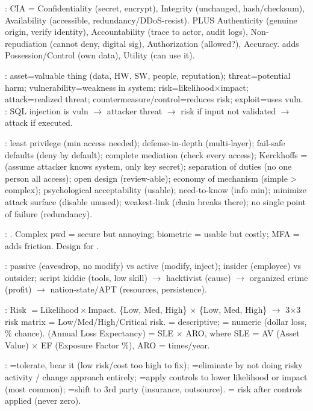 
: CIA = Confidentiality (secret, encrypt), Integrity (unchanged, hash/checksum), Availability (accessible, redundancy/DDoS-resist). PLUS Authenticity (genuine origin, verify identity), Accountability (trace to actor, audit logs), Non-repudiation (cannot deny, digital sig), Authorization (allowed?), Accuracy.  adds Possession/Control (own data), Utility (can use it).

: asset=valuable thing (data, HW, SW, people, reputation); threat=potential harm; vulnerability=weakness in system; risk=likelihood$\times$impact; attack=realized threat; countermeasure/control=reduces risk; exploit=uses vuln. : SQL injection is vuln $\to$ attacker threat $\to$ risk if input not validated $\to$ attack if executed.

: least privilege (min access needed); defense-in-depth (multi-layer); fail-safe defaults (deny by default); complete mediation (check every access); Kerckhoffs =  (assume attacker knows system, only key secret); separation of duties (no one person all access); open design (review-able); economy of mechanism (simple > complex); psychological acceptability (usable); need-to-know (info min); minimize attack surface (disable unused); weakest-link (chain breaks there); no single point of failure (redundancy).

: . Complex pwd = secure but annoying; biometric = usable but costly; MFA = adds friction. Design for .

: passive (eavesdrop, no modify) vs active (modify, inject); insider (employee) vs outsider; script kiddie (tools, low skill) $\to$ hacktivist (cause) $\to$ organized crime (profit) $\to$ nation-state/APT (resources, persistence).


: Risk $= \text{Likelihood} \times \text{Impact}$.  \{Low, Med, High\} $\times$  \{Low, Med, High\} $\to$ 3$\times$3 risk matrix = Low/Med/High/Critical risk.  = descriptive;  = numeric (dollar loss, \% chance).  (Annual Loss Expectancy) = SLE $\times$ ARO, where SLE = AV (Asset Value) $\times$ EF (Exposure Factor \%), ARO = times/year.

: =tolerate, bear it (low risk/cost too high to fix); =eliminate by not doing risky activity / change approach entirely; =apply controls to lower likelihood or impact (most common); =shift to 3rd party (insurance, outsource).  = risk after controls applied (never zero).

